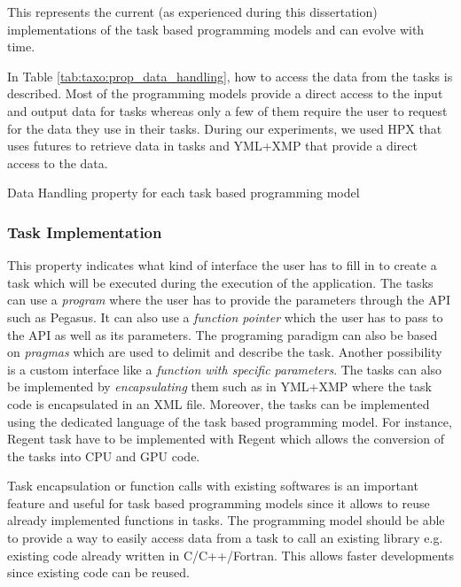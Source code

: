 This represents the current (as experienced during this dissertation) implementations of the task based programming models and can evolve with time.

In Table \ref{tab:taxo:prop_data_handling}, how to access the data from the tasks is described.
Most of the programming models provide a direct access to the input and output data for tasks whereas only a few of them require the user to request for the data they use in their tasks.
During our experiments, we used HPX that uses futures to retrieve data in tasks and YML+XMP that provide a direct access to the data.

\begin{table}[H]
	\caption{Data Handling property for each task based programming model \label{tab:taxo:prop_data_handling}}
	\centering
	\begin{multicols}{2}
		

		
	\end{multicols}
\end{table}

\subsubsection{Task Implementation}
This property indicates what kind of interface the user has to fill in to create a task which will be executed during the execution of the application.
The tasks can use a \textit{program} where the user has to provide the parameters through the API such as Pegasus.
It can also use a \textit{function pointer} which the user has to pass to the API as well as its parameters.
The programing paradigm can also be based on \textit{pragmas} which are used to delimit and describe the task.
Another possibility is a custom interface like a \textit{function with specific parameters}.
The tasks can also be implemented by \textit{encapsulating} them such as in YML+XMP where the task code is encapsulated in an XML file.
Moreover, the tasks can be implemented using the dedicated language of the task based programming model.
For instance, Regent task have to be implemented with Regent which allows the conversion of the tasks into CPU and GPU code.

Task encapsulation or function calls with existing softwares is an important feature and useful for task based programming models since it allows to reuse already implemented functions in tasks.
The programming model should be able to provide a way to easily access data from a task to call an existing library e.g. existing code already written in C/C++/Fortran.
This allows faster developments since existing code can be reused.

